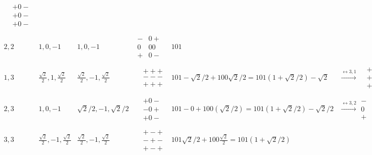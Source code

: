 \documentclass[twoside,10pt]{amsart}
\begin{document}
\begin{enumerate}
\[\begin{matrix}
\begin{aligned}
    & +0- \\
    & +0- \\
    & +0-
\end{aligned} \\
\quad \\ 
2,2 & 1, 0 , -1 & 1, 0 , -1 & \begin{aligned}
    -&0+ \\
    0&00 \\
    +&0-
\end{aligned} & 101 & \quad \\
\quad \\
1,3 & \frac{ \sqrt{2}}{2}, 1 , \frac{ \sqrt{2}}{2} & \frac{ \sqrt{2}}{2}, -1 , \frac{ \sqrt{2}}{2}  & \begin{aligned}
    & +++ \\
    & --- \\
    & +++
\end{aligned} & 101 - \sqrt{2}/2 +100\sqrt{2}/2 = 101(1+\sqrt{2}/2) - \sqrt{2} & \xrightarrow{\leftrightarrow 3,1} \begin{aligned}
    & +-+ \\
    & +-+ \\
    & +-+
\end{aligned} \\
\quad \\ 
2,3 & 1, 0 , -1 & \sqrt{2}/2, -1 ,\sqrt{2}/2  & \begin{aligned}
    & +0- \\
    & -0+ \\
    & +0-
\end{aligned} & 101 - 0 + 100(\sqrt{2}/2) = 101 (1 + \sqrt{2}/2) - \sqrt{2}/2  & \xrightarrow{\leftrightarrow 3,2} \begin{aligned}
    -&+- \\
    0&00 \\
    +&-+
\end{aligned} \\
\quad \\
3,3 & \frac{ \sqrt{2}}{2}, -1 , \frac{ \sqrt{2}}{2} & \frac{ \sqrt{2}}{2}, -1 ,\frac{ \sqrt{2}}{2}  & \begin{aligned}
    & +-+ \\
    & -+- \\
    & +-+
\end{aligned} & 101  \sqrt{2}/2 +100\frac{\sqrt{2}}{2} = 101 (1+ \sqrt{2}/2) & \quad  \\
\end{matrix}
\]
\end{enumerate}
\end{document}
